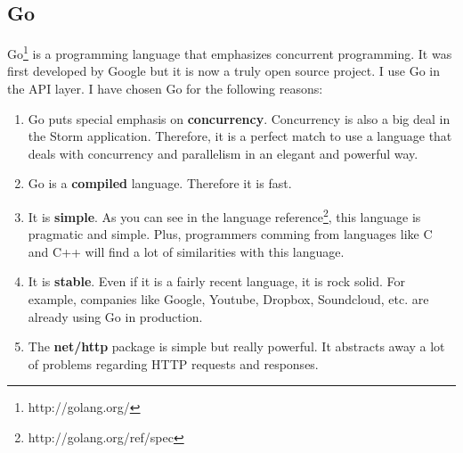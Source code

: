 \subsection{Go}
\label{sec:go}

Go\footnote{http://golang.org/} is a programming language that emphasizes
concurrent programming. It was first developed by Google but it is now a truly
open source project. I use Go in the API layer. I have chosen Go for the
following reasons:

\begin{enumerate}
  \item Go puts special emphasis on {\bf concurrency}. Concurrency is also a
big deal in the Storm application. Therefore, it is a perfect match to use a
language that deals with concurrency and parallelism in an elegant and powerful
way.
  \item Go is a {\bf compiled} language. Therefore it is fast.
  \item It is {\bf simple}. As you can see in the language
reference\footnote{http://golang.org/ref/spec}, this language is pragmatic and
simple. Plus, programmers comming from languages like C and C++ will find a lot
of similarities with this language.
  \item It is {\bf stable}. Even if it is a fairly recent language, it is rock
solid. For example, companies like Google, Youtube, Dropbox, Soundcloud, etc.
are already using Go in production.
  \item The {\bf net/http} package is simple but really powerful. It abstracts
away a lot of problems regarding HTTP requests and responses.
\end{enumerate}
